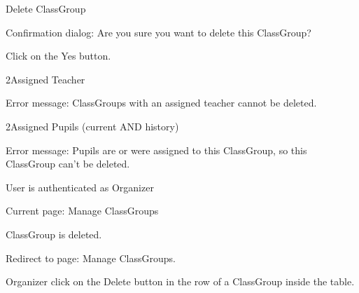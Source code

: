 
\begin{uc}{Delete ClassGroup}


    \begin{uc-mss}
    \item Confirmation dialog: Are you sure you want to delete this ClassGroup?
    \item Click on the Yes button.
    \end{uc-mss}

    \begin{uc-ext}

        \begin{uc-fail}{2}{Assigned Teacher}
        \item Error message: ClassGroups with an assigned teacher cannot be deleted.
        \end{uc-fail}
        
        \begin{uc-fail}{2}{Assigned Pupils (current AND history)}
        \item Error message: Pupils are or were assigned to this ClassGroup, so this
        ClassGroup can't be deleted.
        \end{uc-fail}

    \end{uc-ext}

    \begin{uc-pre}
    \item User is authenticated as Organizer
    \item Current page: Manage ClassGroups
    \end{uc-pre}

    \begin{uc-post}
    \item ClassGroup is deleted.
    \item Redirect to page: Manage ClassGroups.
    \end{uc-post}

    \begin{uc-trig}
        Organizer click on the Delete button in the row of a ClassGroup inside the table.
    \end{uc-trig}
\end{uc}

